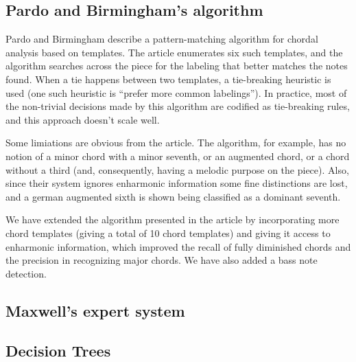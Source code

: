 \documentclass{article}
\newcommand{\comment}[1]{}
\begin{document}
\subsection{Pardo and Birmingham's algorithm}
\label{sec:pardo}

\comment{
  ==> algoritmo descrito em \cite{pardo.ea:algorithms}
  ==> baseado em templates e pattern matching
  ==> ignora enarmonia
  ==> feature é um conjunto de pitches
  ==> nossa extensão:
  ===> mais templates
  ===> enarmonia
  ==> regras de desempate: a princípio promissoras, mas a abordagem
  não escala bem
}

Pardo and Birmingham \cite{pardo.ea:algorithms} describe a
pattern-matching algorithm for chordal analysis based on
templates. The article enumerates six such templates, and the
algorithm searches across the piece for the labeling that better
matches the notes found. When a tie happens between two templates, a
tie-breaking heuristic is used (one such heuristic is ``prefer more
common labelings''). In practice, most of the non-trivial decisions
made by this algorithm are codified as tie-breaking rules, and this
approach doesn't scale well.

Some limiations are obvious from the article. The algorithm, for
example, has no notion of a minor chord with a minor seventh, or an
augmented chord, or a chord without a third (and, consequently, having
a melodic purpose on the piece). Also, since their system ignores
enharmonic information some fine distinctions are lost, and a german
augmented sixth is shown being classified as a dominant seventh.

We have extended the algorithm presented in the article by
incorporating more chord templates (giving a total of 10 chord
templates) and giving it access to enharmonic information, which
improved the recall of fully diminished chords and the precision in
recognizing major chords. We have also added a bass note detection.

\subsection{Maxwell's expert system}
\label{sec:maxwell}


\subsection{Decision Trees}
\label{sec:tree}

\comment{
  ==> ID3 algorithm
  ==> features: sequência de pitches
  ==> dependência em quatro vozes 
}
\end{document}

